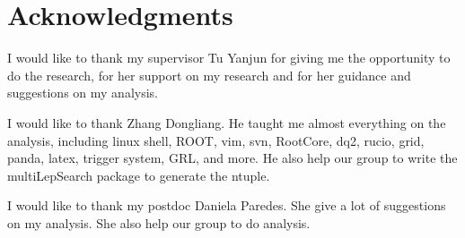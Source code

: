 
\chapter*{Acknowledgments}

I would like to thank my supervisor Tu Yanjun for giving me the opportunity to do the research, for her support on my research and for her guidance and suggestions on my analysis.

I would like to thank Zhang Dongliang. He taught me almost everything on the analysis, including linux shell, ROOT, vim, svn, RootCore, dq2, rucio, grid, panda, latex, trigger system, GRL, and more.
He also help our group to write the multiLepSearch package to generate the ntuple.

I would like to thank my postdoc Daniela Paredes.
She give a lot of suggestions on my analysis.
She also help our group to do analysis.

